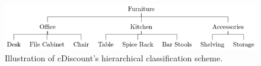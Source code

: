 \begin{figure}
\includegraphics[width=\columnwidth]{img/hierarchy}
\caption{
Illustration of cDiscount's hierarchical classification scheme.
}
\label{fig:hierarchy}
\end{figure}